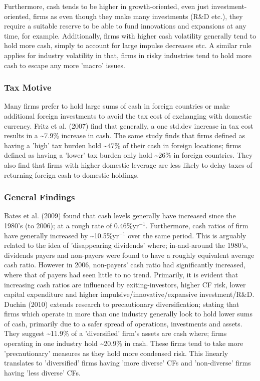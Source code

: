 \documentclass[11pt, english]{article}
\begin{document}
	Furthermore, cash tends to be higher in growth-oriented, even just investment- oriented, firms as even though they make many investments (R\&D etc.), they require a suitable reserve to be able to fund innovations and expansions at any time, for example. Additionally, firms with higher cash volatility generally tend to hold more cash, simply to account for large impulse decreases etc. A similar rule applies for industry volatility in that, firms in risky industries tend to hold more cash to escape any more 'macro' issues.

		\subsubsection*{Tax Motive}

	Many firms prefer to hold large sums of cash in foreign countries or make additional foreign investments to avoid the tax cost of exchanging with domestic currency. Fritz et al. (2007) find that generally, a one std.dev increase in tax cost results in a \~{}7.9\% increase in cash. The same study finds that firms defined as having a 'high' tax burden hold \~{}47\% of their cash in foreign locations; firms defined as having a 'lower' tax burden only hold \~{}26\% in foreign countries. They also find that firms with higher domestic leverage are less likely to delay taxes of returning foreign cash to domestic holdings.

		\subsubsection*{General Findings}

	Bates et al. (2009) found that cash levels generally have increased since the 1980's (to 2006); at a rough rate of 0.46\%yr$^{-1}$. Furthermore, cash ratios of firm have generally increased by \~{}10.5\%yr$^{-1}$ over the same period. This is arguably related to the idea of 'disappearing dividends' where; in-and-around the 1980's, dividends payers and non-payers were found to have a roughly equivalent average cash ratio. However in 2006, non-payers' cash ratio had significantly increased, where that of payers had seen little to no trend. Primarily, it is evident that increasing cash ratios are influenced by exiting-investors, higher CF risk, lower capital expenditure and higher impulsive/innovative/expansive investment/R\&D.\\

	Duchin (2010) extends research to precautionary diversification; stating that firms which operate in more than one industry generally look to hold lower sums of cash, primarily due to a safer spread of operations, investments and assets. They suggest \~{}11.9\% of a 'diversified' firm's assets are cash where; firms operating in one industry hold \~{}20.9\% in cash. These firms tend to take more 'precautionary' measures as they hold more condensed risk. This linearly translates to 'diversified' firms having 'more diverse' CFs and 'non-diverse' firms having 'less diverse' CFs.\\
\end{document}
